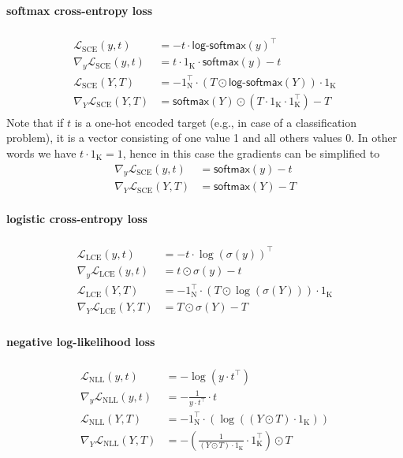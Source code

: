 \documentclass[twoside,11pt]{article}
\newcommand{\const}[1]{\ensuremath{\mathrm{#1}}} %
\newcommand{\func}[1]{\ensuremath{\textsf{#1}}} %
\begin{document}
\paragraph{softmax cross-entropy loss}
\begin{align}
\begin{split}
  \mathcal{L}_\text{SCE}(y, t) &= - t \cdot \func{log-softmax}(y)^\top
  \\
  \nabla_y \mathcal{L}_\text{SCE}(y, t) &= t \cdot 1_\const{K} \cdot \func{softmax}(y) - t
  \\
  \mathcal{L}_\text{SCE}(Y, T) &= - 1_\const{N}^\top \cdot (T \odot \func{log-softmax}(Y)) \cdot 1_\const{K}
  \\
  \nabla_Y \mathcal{L}_\text{SCE}(Y, T) &= \func{softmax}(Y) \odot (T \cdot 1_\const{K} \cdot 1_\const{K}^\top) - T
\end{split}
\end{align}
Note that if $t$ is a one-hot encoded target (e.g., in case of a classification problem),
it is a vector consisting of one value 1 and all others values 0. In other words
we have $t \cdot 1_\const{K} = 1$, hence in this case the gradients can be simplified to
\begin{align*}
  \nabla_y \mathcal{L}_\text{SCE}(y, t) &= \func{softmax}(y) - t \\
  \nabla_Y \mathcal{L}_\text{SCE}(Y, T) &= \func{softmax}(Y) - T
\end{align*}

\paragraph{logistic cross-entropy loss}
\begin{align}
  \begin{split}
  \label{eq:logistic-cross-entropy-loss}
  \mathcal{L}_\text{LCE}(y, t) &= - t \cdot \log(\sigma(y))^\top
  \\
  \nabla_y \mathcal{L}_\text{LCE}(y, t) &= t \odot \sigma(y) - t
  \\
  \mathcal{L}_\text{LCE}(Y, T) &= - 1_\const{N}^\top \cdot (T \odot \log(\sigma(Y))) \cdot 1_\const{K}
  \\
  \nabla_Y \mathcal{L}_\text{LCE}(Y, T) &= T \odot \sigma(Y) - T
  \end{split}
\end{align}

\paragraph{negative log-likelihood loss}
\begin{align}
\begin{split}
  \mathcal{L}_\text{NLL}(y, t) &= - \log(y \cdot t^\top)
  \\
  \nabla_y \mathcal{L}_\text{NLL}(y, t) &= - \frac{1}{y \cdot t^\top} \cdot t
  \\
  \mathcal{L}_\text{NLL}(Y, T) &= - 1_\const{N}^\top \cdot (\log((Y \odot T) \cdot 1_\const{K}))
  \\
  \nabla_Y \mathcal{L}_\text{NLL}(Y, T) &= -\left( \frac{1}{(Y \odot T) \cdot 1_\const{K}} \cdot 1_\const{K}^\top \right) \odot T
\end{split}
\end{align}
\end{document}
